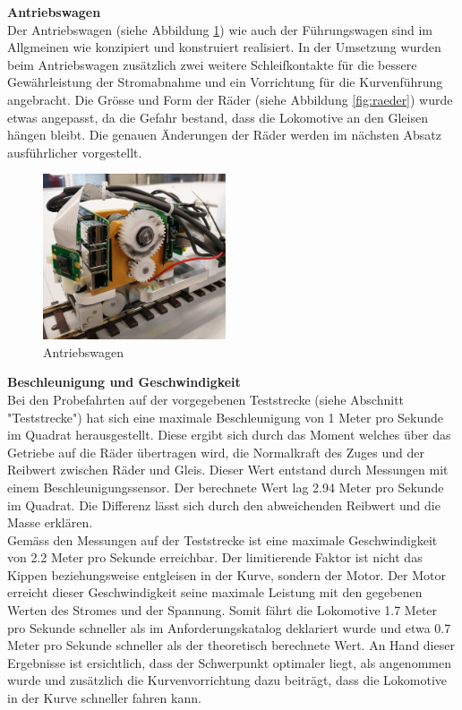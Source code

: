 \documentclass[../../main.tex]{subfiles}
\begin{document}
\textbf{Antriebswagen}\\
Der Antriebswagen (siehe Abbildung \ref{fig:antriebswagen3}) wie auch der Führungswagen sind im Allgmeinen wie konzipiert und konstruiert realisiert. In der Umsetzung wurden beim Antriebswagen zusätzlich zwei weitere Schleifkontakte für die bessere Gewährleistung der Stromabnahme und ein Vorrichtung für die Kurvenführung angebracht. Die Grösse und Form der Räder (siehe Abbildung \ref{fig:raeder}) wurde etwas angepasst, da die Gefahr bestand, dass die Lokomotive an den Gleisen hängen bleibt. Die genauen Änderungen der Räder werden im nächsten Absatz ausführlicher vorgestellt.\\

\begin{figure}[H]
  \centering
  \includegraphics[width=0.48\textwidth]{antriebswagen1.PNG}
  \caption {Antriebswagen}
  \label{fig:antriebswagen3}
\end{figure}

\pagebreak

\textbf{Beschleunigung und Geschwindigkeit}\\
Bei den Probefahrten auf der vorgegebenen Teststrecke (siehe Abschnitt "Teststrecke") hat sich eine maximale Beschleunigung von 1 Meter pro Sekunde im Quadrat herausgestellt. Diese ergibt sich durch das Moment welches über das Getriebe auf die Räder übertragen wird, die Normalkraft des Zuges und der Reibwert zwischen Räder und Gleis. Dieser Wert entstand durch Messungen mit einem Beschleunigungssensor. Der berechnete Wert lag 2.94 Meter pro Sekunde im Quadrat. Die Differenz lässt sich durch den abweichenden Reibwert und die Masse erklären.\\
Gemäss den Messungen auf der Teststrecke ist eine maximale Geschwindigkeit von 2.2 Meter pro Sekunde erreichbar. Der limitierende Faktor ist nicht das Kippen beziehungsweise entgleisen in der Kurve, sondern der Motor. Der Motor erreicht dieser Geschwindigkeit seine maximale Leistung mit den gegebenen Werten des Stromes und der Spannung. Somit fährt die Lokomotive 1.7 Meter pro Sekunde schneller als im Anforderungskatalog deklariert wurde und etwa 0.7 Meter pro Sekunde schneller als der theoretisch berechnete Wert. An Hand dieser Ergebnisse ist ersichtlich, dass der Schwerpunkt optimaler liegt, als angenommen wurde und zusätzlich die Kurvenvorrichtung dazu beiträgt, dass die Lokomotive in der Kurve schneller fahren kann.\\
\end{document}
